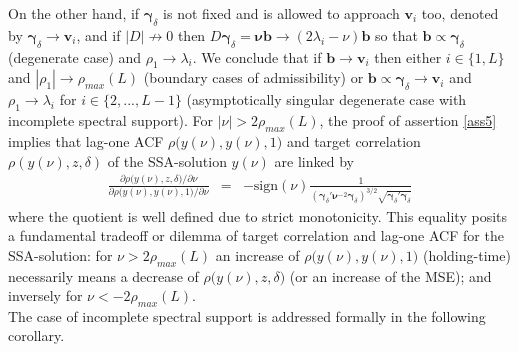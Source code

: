 \documentclass[a4paper]{article}
\begin{document}
On the other hand, if $\boldsymbol{\gamma}_{\delta}$ is not fixed and is allowed to approach $\mathbf{v}_i$ too,  denoted by  $\boldsymbol{\gamma}_{\delta}\to\mathbf{v}_i$, and if $|D|\not\to 0$ then $D\boldsymbol{\gamma}_{\delta}=\boldsymbol{\nu}\mathbf{b}\to(2\lambda_i-\nu)\mathbf{b}$ so that $\mathbf{b}\propto \boldsymbol{\gamma}_{\delta}$ (degenerate case) and $\rho_1\to\lambda_i$. %
We conclude that if $\mathbf{b}\to\mathbf{v}_i$ then either $i\in\{1,L\}$ and $|\rho_1|\to\rho_{max}(L)$ (boundary cases of admissibility) or $\mathbf{b}\propto\boldsymbol{\gamma}_{\delta}\to \mathbf{v}_i$ and $\rho_1\to\lambda_i$ for $i\in\{2,...,L-1\}$ (asymptotically singular degenerate case with   incomplete spectral support). For $|\nu|>2\rho_{max}(L)$, the proof of assertion \ref{ass5} implies that lag-one ACF $\rho\Big(y(\nu),y(\nu),1\Big)$ and  target correlation $\rho(y(\nu),z,\delta)$ of the SSA-solution $y(\nu)$ are linked by 
\begin{eqnarray*}
\frac{\partial\rho\Big(y(\nu),z,\delta\Big)/\partial \nu}{\partial\rho\Big(y(\nu),y(\nu),1\Big)/\partial \nu}&=&-\textrm{sign}(\nu)\frac{1}{\left(\boldsymbol{\gamma}_{\delta}'\boldsymbol{\nu}^{-2}\boldsymbol{\gamma}_{\delta}\right)^{3/2}\sqrt{\boldsymbol{\gamma}_{\delta}'\boldsymbol{\gamma}_{\delta}}}
\end{eqnarray*}
where the quotient is well defined due to strict monotonicity.  
This equality posits a fundamental tradeoff or dilemma of target correlation and lag-one ACF for the SSA-solution: for $\nu>2\rho_{max}(L)$ an increase of  $\rho\Big(y(\nu),y(\nu),1\Big)$ (holding-time) necessarily means a decrease of $\rho\Big(y(\nu),z,\delta\Big)$ (or an increase of the MSE); and inversely for $\nu<-2\rho_{max}(L)$. \\

The case of incomplete spectral support is addressed formally in the following corollary. 
\end{document}
